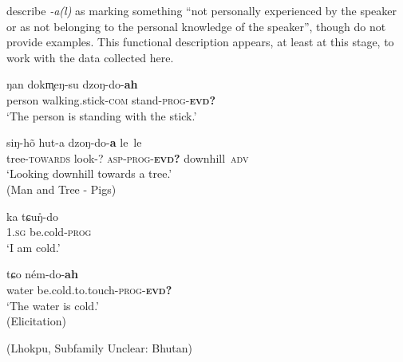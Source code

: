 \cite[20-21]{Grollmann2018} describe \textit{-a(l)} as marking something ``not personally experienced by the speaker or as not belonging to the personal knowledge of the speaker'', though do not provide examples. This functional description appears, at least at this stage, to work with the data collected here.

\begin{exe}
\ex\label{e:Methods:LhokpuVerbal}
\begin{xlist}
\ex \label{e:Methods:LhokpuVerbal:coda}
\gll ŋan dokm̥eŋ-su dzoŋ-do-\textbf{ah} \\
person walking.stick-\textsc{com} stand-\textsc{prog-\textbf{evd?}} \\
\glt `The person is standing with the stick.'

\ex \label{e:Methods:LhokpuVerbal:nocoda}
\gll siŋ-hõ hut-a dzoŋ-do-\textbf{a} le~le \\
tree-\textsc{towards} look-? \textsc{asp-prog-\textbf{evd?}} downhill~\textsc{adv} \\
\glt `Looking downhill towards a tree.' \\
(Man and Tree - Pigs)

\ex \label{e:Methods:LhokpuVerbal:cold}
\gll ka tɕuŋ̊-do \\
\textsc{1.sg} be.cold-\textsc{prog} \\
\glt `I am cold.'

\ex \label{e:Methods:LhokpuVerbal:coldevid}
\gll tɕo ném-do-\textbf{ah} \\
water be.cold.to.touch-\textsc{prog-\textbf{evd?}} \\
\glt `The water is cold.' \\
(Elicitation)


\end{xlist}
(Lhokpu, Subfamily Unclear: Bhutan)
\end{exe}

